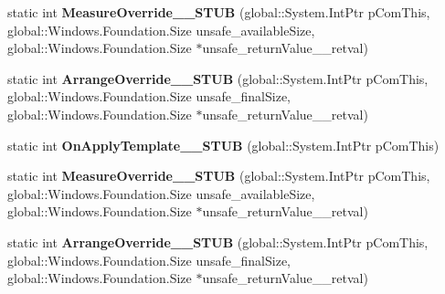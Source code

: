 \begin{DoxyCompactItemize}
static int {\bfseries Measure\+Override\+\_\+\+\_\+\+S\+T\+UB} (global\+::\+System.\+Int\+Ptr p\+Com\+This, global\+::\+Windows.\+Foundation.\+Size unsafe\+\_\+available\+Size, global\+::\+Windows.\+Foundation.\+Size $\ast$unsafe\+\_\+return\+Value\+\_\+\+\_\+retval)
\item 
\mbox{\label{struct_windows_1_1_u_i_1_1_xaml_1_1_i_framework_element_overrides_____impl_1_1_vtbl_a2177ef78910883f57615b7031eb3275d}} 
static int {\bfseries Arrange\+Override\+\_\+\+\_\+\+S\+T\+UB} (global\+::\+System.\+Int\+Ptr p\+Com\+This, global\+::\+Windows.\+Foundation.\+Size unsafe\+\_\+final\+Size, global\+::\+Windows.\+Foundation.\+Size $\ast$unsafe\+\_\+return\+Value\+\_\+\+\_\+retval)
\item 
\mbox{\label{struct_windows_1_1_u_i_1_1_xaml_1_1_i_framework_element_overrides_____impl_1_1_vtbl_a841071145d85fc2688f3ab08ddfce8e4}} 
static int {\bfseries On\+Apply\+Template\+\_\+\+\_\+\+S\+T\+UB} (global\+::\+System.\+Int\+Ptr p\+Com\+This)
\item 
\mbox{\label{struct_windows_1_1_u_i_1_1_xaml_1_1_i_framework_element_overrides_____impl_1_1_vtbl_a5e90f05f7e53cc029590bf156c3f4fc2}} 
static int {\bfseries Measure\+Override\+\_\+\+\_\+\+S\+T\+UB} (global\+::\+System.\+Int\+Ptr p\+Com\+This, global\+::\+Windows.\+Foundation.\+Size unsafe\+\_\+available\+Size, global\+::\+Windows.\+Foundation.\+Size $\ast$unsafe\+\_\+return\+Value\+\_\+\+\_\+retval)
\item 
\mbox{\label{struct_windows_1_1_u_i_1_1_xaml_1_1_i_framework_element_overrides_____impl_1_1_vtbl_a2177ef78910883f57615b7031eb3275d}} 
static int {\bfseries Arrange\+Override\+\_\+\+\_\+\+S\+T\+UB} (global\+::\+System.\+Int\+Ptr p\+Com\+This, global\+::\+Windows.\+Foundation.\+Size unsafe\+\_\+final\+Size, global\+::\+Windows.\+Foundation.\+Size $\ast$unsafe\+\_\+return\+Value\+\_\+\+\_\+retval)
\item 
\mbox{\label{struct_windows_1_1_u_i_1_1_xaml_1_1_i_framework_element_overrides_____impl_1_1_vtbl_a841071145d85fc2688f3ab08ddfce8e4}} 

\end{DoxyCompactItemize}
